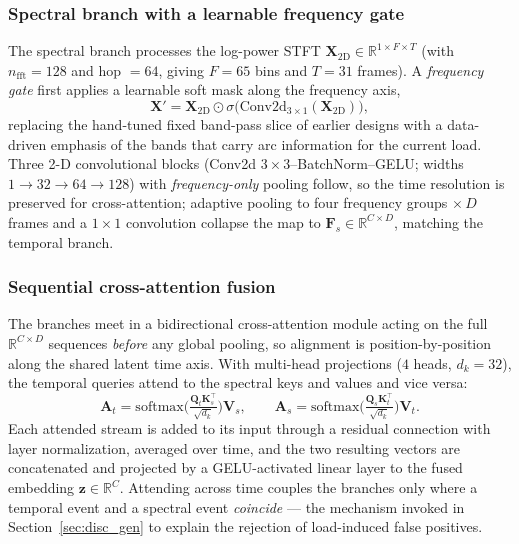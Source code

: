 \documentclass[journal,article,submit,moreauthors]{Definitions/mdpi}
\begin{document}
\subsubsection{Spectral branch with a learnable frequency gate}
The spectral branch processes the log-power STFT $\mathbf{X}_{2\mathrm{D}}\in\mathbb{R}^{1\times F\times T}$ (with $n_{\mathrm{fft}}=128$ and hop $=64$, giving $F=65$ bins and $T=31$ frames). A \emph{frequency gate} first applies a learnable soft mask along the frequency axis,
\begin{equation}
\mathbf{X}' = \mathbf{X}_{2\mathrm{D}}\odot\sigma\!\big(\mathrm{Conv2d}_{3\times1}(\mathbf{X}_{2\mathrm{D}})\big),
\label{eq:freqgate}
\end{equation}
replacing the hand-tuned fixed band-pass slice of earlier designs with a data-driven emphasis of the bands that carry arc information for the current load. Three 2-D convolutional blocks (Conv2d $3\times3$--BatchNorm--GELU; widths $1\!\to\!32\!\to\!64\!\to\!128$) with \emph{frequency-only} pooling follow, so the time resolution is preserved for cross-attention; adaptive pooling to four frequency groups $\times\,D$ frames and a $1\times1$ convolution collapse the map to $\mathbf{F}_{s}\in\mathbb{R}^{C\times D}$, matching the temporal branch.

\subsubsection{Sequential cross-attention fusion}
The branches meet in a bidirectional cross-attention module acting on the full $\mathbb{R}^{C\times D}$ sequences \emph{before} any global pooling, so alignment is position-by-position along the shared latent time axis. With multi-head projections ($4$ heads, $d_{k}=32$), the temporal queries attend to the spectral keys and values and vice versa:
\begin{equation}
\mathbf{A}_{t}=\mathrm{softmax}\!\Big(\tfrac{\mathbf{Q}_{t}\mathbf{K}_{s}^{\top}}{\sqrt{d_{k}}}\Big)\mathbf{V}_{s},
\qquad
\mathbf{A}_{s}=\mathrm{softmax}\!\Big(\tfrac{\mathbf{Q}_{s}\mathbf{K}_{t}^{\top}}{\sqrt{d_{k}}}\Big)\mathbf{V}_{t}.
\label{eq:xattn}
\end{equation}
Each attended stream is added to its input through a residual connection with layer normalization, averaged over time, and the two resulting vectors are concatenated and projected by a GELU-activated linear layer to the fused embedding $\mathbf{z}\in\mathbb{R}^{C}$. Attending across time couples the branches only where a temporal event and a spectral event \emph{coincide} --- the mechanism invoked in Section~\ref{sec:disc_gen} to explain the rejection of load-induced false positives.
\end{document}
